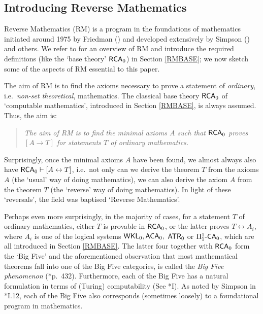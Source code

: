 \documentclass[reqno]{amsart}
\def\FIVE{\Pi_{1}^{1}\text{-\textup{\textsf{CA}}}_{0}}
\def\ATR{\textup{\textsf{ATR}}}
\def\RCA{\textup{\textsf{RCA}}}
\def\WKL{\textup{\textsf{WKL}}}
\def\di{\rightarrow}
\def\asa{\leftrightarrow}
\def\ACA{\textup{\textsf{ACA}}}
\numberwithin{equation}{section}
\numberwithin{thm}{section}
\begin{document}
\subsection{Introducing Reverse Mathematics}\label{RM}
Reverse Mathematics (RM) is a program in the foundations of mathematics initiated around 1975 by Friedman (\cites{fried,fried2}) and developed extensively by Simpson (\cite{simpson2}) and others.  We refer to \cite{simpson2} for an overview of RM and introduce the required definitions (like the `base theory' $\RCA_{0}$) in Section \ref{RMBASE}; we now sketch some of the aspects of RM essential to this paper.  

\smallskip
  
The aim of RM is to find the axioms necessary to prove a statement of \emph{ordinary}, i.e.\ \emph{non-set theoretical}, mathematics.   
The classical base theory $\RCA_{0}$ of `computable mathematics', introduced in Section \ref{RMBASE}, is always assumed.  
Thus, the aim is:  
\begin{quote}
\emph{The aim of \emph{RM} is to find the minimal axioms $A$ such that $\RCA_{0}$ proves $ [A\di T]$ for statements $T$ of ordinary mathematics.}
\end{quote}
Surprisingly, once the minimal axioms $A$ have been found, we almost always also have $\RCA_{0}\vdash [A\asa T]$, i.e.\ not only can we derive the theorem $T$ from the axioms $A$ (the `usual' way of doing mathematics), we can also derive the axiom $A$ from the theorem $T$ (the `reverse' way of doing mathematics).  In light of these `reversals', the field was baptised `Reverse Mathematics'.  

\smallskip

Perhaps even more surprisingly, in the majority of cases, for a statement $T$ of ordinary mathematics, either $T$ is provable in $\RCA_{0}$, or the latter proves $T\asa A_{i}$, where $A_{i}$ is one of the logical systems $\WKL_{0}, \ACA_{0},$ $ \ATR_{0}$ or $\FIVE$, which are all introduced in Section \ref{RMBASE}.  The latter four together with $\RCA_{0}$ form the `Big Five' and the aforementioned observation that most mathematical theorems fall into one of the Big Five categories, is called the \emph{Big Five phenomenon} (\cite{montahue}*{p.~432}).  
Furthermore, each of the Big Five has a natural formulation in terms of (Turing) computability (See \cite{simpson2}*{I}).
As noted by Simpson in \cite{simpson2}*{I.12}, each of the Big Five also corresponds (sometimes loosely) to a foundational program in mathematics.  
\end{document}
